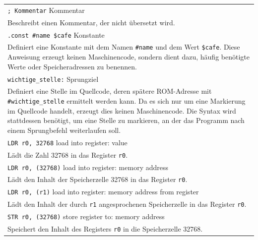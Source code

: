 {
    \small

    \begin{longtable}{|p{\textwidth}|}
        \hline
        \verb|; Kommentar|
        \hfill {\footnotesize Kommentar}
        \\
        Beschreibt einen Kommentar, der nicht übersetzt wird.
        \\

        \hline
        \verb|.const #name $cafe|
        \hfill {\footnotesize Konstante}
        \\
        Definiert eine Konstante mit dem Namen \verb|#name| und dem Wert \verb|$cafe|.
        Diese Anweisung erzeugt keinen Maschinencode, sondern dient dazu, häufig
        benötigte Werte oder Speicheradressen zu benennen.
        \\

        \hline
        \verb|wichtige_stelle:|
        \hfill {\footnotesize Sprungziel}
        \\
        Definiert eine Stelle im Quellcode, deren spätere ROM-Adresse mit
        \verb|#wichtige_stelle| ermittelt werden kann. Da es sich nur um eine
        Markierung im Quellcode handelt, erzeugt dies keinen Maschinencode.
        Die Syntax wird stattdessen benötigt, um eine Stelle zu markieren, an
        der das Programm nach einem Sprungbefehl weiterlaufen soll.
        \\

        \hline
        \hline

        \hline
        \verb|LDR r0, 32768|
        \hfill {\footnotesize load into register: value}
        \\
        Lädt die Zahl 32768 in das Register \texttt{r0}.
        \\

        \hline
        \verb|LDR r0, (32768)|
        \hfill {\footnotesize load into register: memory address}
        \\
        Lädt den Inhalt der Speicherzelle 32768 in das Register \texttt{r0}.
        \\

        \hline
        \verb|LDR r0, (r1)|
        \hfill {\footnotesize load into register: memory address from register}
        \\
        Lädt den Inhalt der durch \texttt{r1} angesprochenen Speicherzelle
        in das Register \texttt{r0}.
        \\

        \hline
        \verb|STR r0, (32768)|
        \hfill {\footnotesize store register to: memory address}
        \\
        Speichert den Inhalt des Registers \texttt{r0} in die Speicherzelle 32768.
        \\


\end{longtable}}
